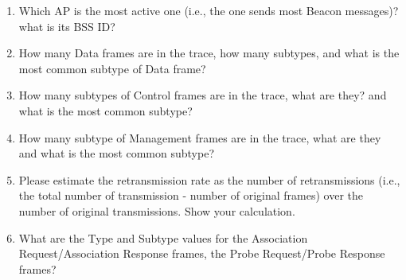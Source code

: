 \begin{enumerate}

\item Which AP is the most active one (i.e., the one sends most Beacon messages)? what is its BSS ID? 

\item How many Data frames are in the trace, how many subtypes, and what is the most common subtype of Data frame?

\item How many subtypes of Control frames are in the trace, what are they? and what is the most common subtype?

\item How many subtype of Management frames are in the trace, what are they and what is the most common subtype?

\item Please estimate the retransmission rate as the number of retransmissions (i.e., the total number of transmission - number of original frames) over the number of original transmissions. Show your calculation.

\item What are the Type and Subtype values for the Association Request/Association Response frames, the Probe Request/Probe Response frames?

\end{enumerate}


